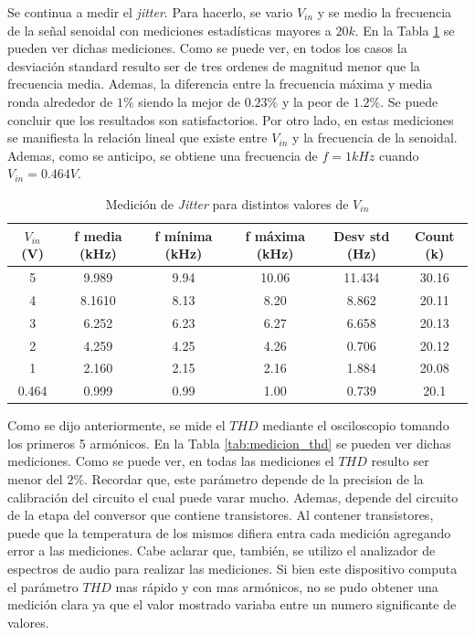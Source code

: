 Se continua a medir el \textit{jitter}. Para hacerlo, se vario $V_{in}$ y se medio la frecuencia de la señal senoidal con mediciones estadísticas mayores a $20k$. En la Tabla \ref{tab:medicion_jitter} se pueden ver dichas mediciones. Como se puede ver, en todos los casos la desviación standard resulto ser de tres ordenes de magnitud menor que la frecuencia media. Ademas, la diferencia entre la frecuencia máxima y media ronda alrededor de $1\%$ siendo la mejor de $0.23\%$ y la peor de $1.2 \%$. Se puede concluir que los resultados son satisfactorios. Por otro lado, en estas mediciones se manifiesta la relación lineal que existe entre $V_{in}$ y la frecuencia de la senoidal. Ademas, como se anticipo, se obtiene una frecuencia de $f = 1kHz$ cuando $V_{in} = 0.464 V$. 

\begin{table}[]
    \centering
    \begin{tabular}{@{}cccccc@{}}
    \toprule
    $V_{in}$ (V) & f media (kHz) & f mínima (kHz) & f máxima (kHz) & Desv std (Hz) & Count (k) \\ \midrule
    5            & 9.989         & 9.94           & 10.06          & 11.434        & 30.16     \\
    4            & 8.1610        & 8.13           & 8.20           & 8.862         & 20.11     \\
    3            & 6.252         & 6.23           & 6.27           & 6.658         & 20.13     \\
    2            & 4.259         & 4.25           & 4.26           & 0.706         & 20.12     \\
    1            & 2.160         & 2.15           & 2.16           & 1.884         & 20.08     \\
    0.464        & 0.999         & 0.99           & 1.00           & 0.739         & 20.1      \\ \bottomrule
    \end{tabular}
    \caption{Medición de \textit{Jitter} para distintos valores de $V_{in}$}
    \label{tab:medicion_jitter}
    \end{table}

Como se dijo anteriormente, se mide el $THD$ mediante el osciloscopio tomando los primeros 5 armónicos. En la Tabla \ref{tab:medicion_thd} se pueden ver dichas mediciones. Como se puede ver, en todas las mediciones el $THD$ resulto ser menor del $2\%$. Recordar que, este parámetro depende de la precision de la calibración del circuito el cual puede varar mucho. Ademas, depende del circuito de la etapa del conversor que contiene transistores. Al contener transistores, puede que la temperatura de los mismos difiera entra cada medición agregando error a las mediciones. Cabe aclarar que, también, se utilizo el analizador de espectros de audio para realizar las mediciones. Si bien este dispositivo computa el parámetro $THD$ mas rápido y con mas armónicos, no se pudo obtener una medición clara ya que el valor mostrado variaba entre un numero significante de valores. 


